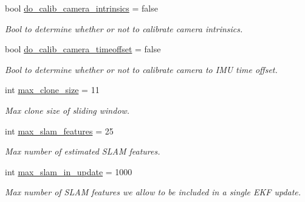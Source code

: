 \begin{DoxyCompactItemize}
bool \hyperlink{structov__msckf_1_1StateOptions_aff5471acfde8d4ddd4cd44e940be5177}{do\+\_\+calib\+\_\+camera\+\_\+intrinsics} = false
\begin{DoxyCompactList}\small\item\em Bool to determine whether or not to calibrate camera intrinsics. \end{DoxyCompactList}\item 
\mbox{\label{structov__msckf_1_1StateOptions_a05dd7ee2f2acaadfbcabfad00a26df25}} 
bool \hyperlink{structov__msckf_1_1StateOptions_a05dd7ee2f2acaadfbcabfad00a26df25}{do\+\_\+calib\+\_\+camera\+\_\+timeoffset} = false
\begin{DoxyCompactList}\small\item\em Bool to determine whether or not to calibrate camera to I\+MU time offset. \end{DoxyCompactList}\item 
\mbox{\label{structov__msckf_1_1StateOptions_a3fbf23951c9d379f51847348f775cfc9}} 
int \hyperlink{structov__msckf_1_1StateOptions_a3fbf23951c9d379f51847348f775cfc9}{max\+\_\+clone\+\_\+size} = 11
\begin{DoxyCompactList}\small\item\em Max clone size of sliding window. \end{DoxyCompactList}\item 
\mbox{\label{structov__msckf_1_1StateOptions_af486dff48a918b3afed0176558d86f65}} 
int \hyperlink{structov__msckf_1_1StateOptions_af486dff48a918b3afed0176558d86f65}{max\+\_\+slam\+\_\+features} = 25
\begin{DoxyCompactList}\small\item\em Max number of estimated S\+L\+AM features. \end{DoxyCompactList}\item 
\mbox{\label{structov__msckf_1_1StateOptions_a13760012f68a944b2b59e9f83bbc9bc5}} 
int \hyperlink{structov__msckf_1_1StateOptions_a13760012f68a944b2b59e9f83bbc9bc5}{max\+\_\+slam\+\_\+in\+\_\+update} = 1000
\begin{DoxyCompactList}\small\item\em Max number of S\+L\+AM features we allow to be included in a single E\+KF update. \end{DoxyCompactList}\item 

\end{DoxyCompactItemize}
